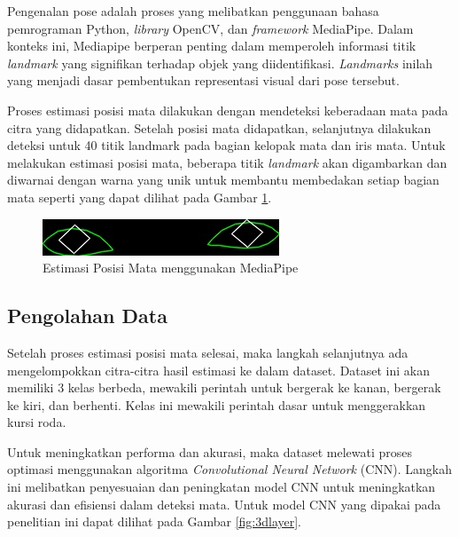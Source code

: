 Pengenalan pose adalah proses yang melibatkan penggunaan bahasa pemrograman Python, \emph{library} OpenCV, dan \emph{framework} MediaPipe. Dalam konteks ini, Mediapipe berperan penting dalam memperoleh informasi titik \emph{landmark} yang signifikan terhadap objek yang diidentifikasi. \emph{Landmarks} inilah yang menjadi dasar pembentukan representasi visual dari pose tersebut.

Proses estimasi posisi mata dilakukan dengan mendeteksi keberadaan mata pada citra yang didapatkan. Setelah posisi mata didapatkan, selanjutnya dilakukan deteksi untuk 40 titik landmark pada bagian kelopak mata dan iris mata. Untuk melakukan estimasi posisi mata, beberapa titik \emph{landmark} akan digambarkan dan diwarnai dengan warna yang unik untuk membantu membedakan setiap bagian mata seperti yang dapat dilihat pada Gambar \ref{fig:estimasi}.

\begin{figure} [ht] \centering
  \includegraphics[scale=0.55]{gambar/bab4/30.jpg}
  \caption{Estimasi Posisi Mata menggunakan MediaPipe}
  \label{fig:estimasi}
\end{figure}

\subsection{Pengolahan Data}

Setelah proses estimasi posisi mata selesai, maka langkah selanjutnya ada mengelompokkan citra-citra hasil estimasi ke dalam dataset. Dataset ini akan memiliki 3 kelas berbeda, mewakili perintah untuk bergerak ke kanan, bergerak ke kiri, dan berhenti. Kelas ini mewakili perintah dasar untuk menggerakkan kursi roda. 

Untuk meningkatkan performa dan akurasi, maka dataset melewati proses optimasi menggunakan algoritma \emph{Convolutional Neural Network} (CNN). Langkah ini melibatkan penyesuaian dan peningkatan model CNN untuk meningkatkan akurasi dan efisiensi dalam deteksi mata. Untuk model CNN yang dipakai pada penelitian ini dapat dilihat pada Gambar \ref{fig:3dlayer}.

